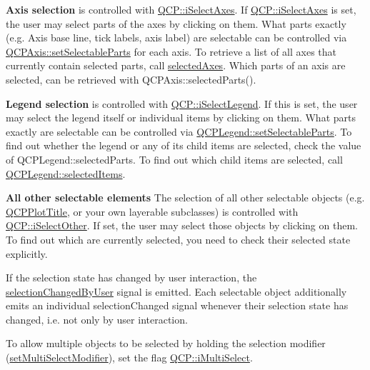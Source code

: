 {\bfseries Axis selection} is controlled with \hyperlink{namespaceQCP_a2ad6bb6281c7c2d593d4277b44c2b037ad6644ac55bef621645326e9dd7469caa}{Q\+C\+P\+::i\+Select\+Axes}. If \hyperlink{namespaceQCP_a2ad6bb6281c7c2d593d4277b44c2b037ad6644ac55bef621645326e9dd7469caa}{Q\+C\+P\+::i\+Select\+Axes} is set, the user may select parts of the axes by clicking on them. What parts exactly (e.\+g. Axis base line, tick labels, axis label) are selectable can be controlled via \hyperlink{classQCPAxis_a513f9b9e326c505d9bec54880031b085}{Q\+C\+P\+Axis\+::set\+Selectable\+Parts} for each axis. To retrieve a list of all axes that currently contain selected parts, call \hyperlink{classQCustomPlot_aa6baf867e8beb96ed5bd471f83ece903}{selected\+Axes}. Which parts of an axis are selected, can be retrieved with Q\+C\+P\+Axis\+::selected\+Parts().

{\bfseries Legend selection} is controlled with \hyperlink{namespaceQCP_a2ad6bb6281c7c2d593d4277b44c2b037a269c9af298e257d1108edec0432b5513}{Q\+C\+P\+::i\+Select\+Legend}. If this is set, the user may select the legend itself or individual items by clicking on them. What parts exactly are selectable can be controlled via \hyperlink{classQCPLegend_a9ce60aa8bbd89f62ae4fa83ac6c60110}{Q\+C\+P\+Legend\+::set\+Selectable\+Parts}. To find out whether the legend or any of its child items are selected, check the value of Q\+C\+P\+Legend\+::selected\+Parts. To find out which child items are selected, call \hyperlink{classQCPLegend_ac93eaf236e911d67aa8b88942ef45c5e}{Q\+C\+P\+Legend\+::selected\+Items}.

{\bfseries All other selectable elements} The selection of all other selectable objects (e.\+g. \hyperlink{classQCPPlotTitle}{Q\+C\+P\+Plot\+Title}, or your own layerable subclasses) is controlled with \hyperlink{namespaceQCP_a2ad6bb6281c7c2d593d4277b44c2b037af67a50bc26147a13b551b3a625374949}{Q\+C\+P\+::i\+Select\+Other}. If set, the user may select those objects by clicking on them. To find out which are currently selected, you need to check their selected state explicitly.

If the selection state has changed by user interaction, the \hyperlink{classQCustomPlot_a500c64a109bc773c973ad274f2fa4190}{selection\+Changed\+By\+User} signal is emitted. Each selectable object additionally emits an individual selection\+Changed signal whenever their selection state has changed, i.\+e. not only by user interaction.

To allow multiple objects to be selected by holding the selection modifier (\hyperlink{classQCustomPlot_a8fc96e3b5138a06759a2a90c166df516}{set\+Multi\+Select\+Modifier}), set the flag \hyperlink{namespaceQCP_a2ad6bb6281c7c2d593d4277b44c2b037aef673112c5067c3cf4cfddb62da7265d}{Q\+C\+P\+::i\+Multi\+Select}.

